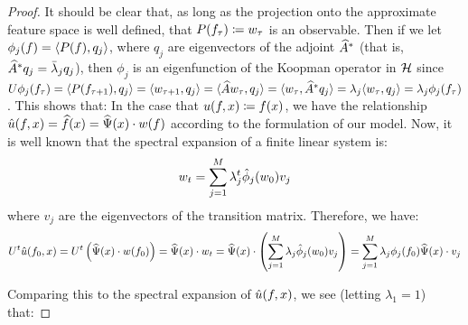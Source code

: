 \begin{proof}
	It should be clear that, as long as the projection onto the approximate feature space is well defined, that $P(f_{\tau}) \coloneqq w_{\tau} $ is an observable. Then if we let $\phi_j(f) = \langle P(f), q_j \rangle$, where $q_j$ are eigenvectors of the adjoint $\widehat{A}^{\ast}$ (that is, $\widehat{A}^{\ast} q_j = \bar \lambda_j q_j$), then $\phi_j$ is an eigenfunction of the Koopman operator in $\mathcal{H}$ since $U \phi_j(f_{\tau}) = \langle P(f_{\tau+1}), q_j \rangle = \langle w_{\tau+1}, q_j \rangle = \langle \widehat{A} w_{\tau}, q_j \rangle =  \langle w_{\tau}, \widehat{A}^{\ast} q_j \rangle =  \lambda_j \langle w_{\tau}, q_j \rangle =  \lambda_j \phi_j(f_{\tau})$. This shows that:
	In the case that $u(f,x) \coloneqq f(x)$, we have the relationship $\hat u(f,x) = \widehat{f}(x) = \widehat{\Psi}(x) \cdot w(f)$ according to the formulation of our model. Now, it is well known that the spectral expansion of a finite linear system is:
	$$ w_t = \sum_{j=1}^{M} \lambda_j^t \hat\phi_j(w_0) v_j$$
	where $v_j$ are the eigenvectors of the transition matrix. Therefore, we have:
	$$ U^t \hat u(f_0,x) = U^t \left( \widehat{\Psi}(x) \cdot w(f_0) \right) = \widehat{\Psi}(x) \cdot w_t = \widehat{\Psi}(x) \cdot \left( \sum_{j=1}^{M} \lambda_j \hat\phi_j(w_0)  v_j \right) = \sum_{j=1}^{M} \lambda_j \phi_j(f_0) \widehat{\Psi}(x) \cdot v_j$$
	
	Comparing this to the spectral expansion of $\hat u(f,x)$, we see (letting $\lambda_1=1$) that:
	
\end{proof}

